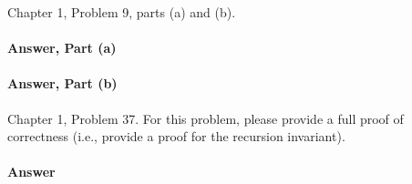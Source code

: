 \documentclass{article}
\begin{document}
\collab{\todo{}}

Chapter 1, Problem 9, parts (a) and (b).

\paragraph{Answer, Part (a)}

\todo{}

\paragraph{Answer, Part (b)}

\todo{}

\collab{\todo{}}

Chapter 1, Problem 37.  For this problem, please provide a full proof of
correctness (i.e., provide a proof for the recursion invariant).

\paragraph{Answer}
\todo{}
\end{document}
